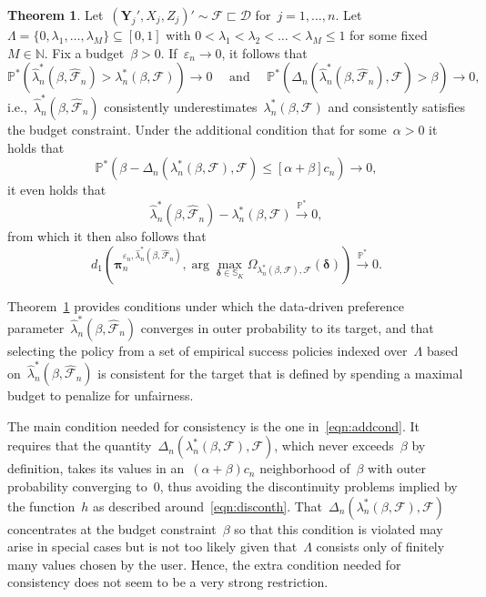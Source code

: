 \documentclass[11pt, a4paper]{article}
\newcommand{\N}{\mathbb{N}}
\newcommand{\cps}{\xrightarrow{\mathbb{P}^*}}
\theoremstyle{definition}
\newtheorem{theorem}{Theorem}[section]
\begin{document}
\begin{theorem}\label{thm:consitune}
Let~$(\bm{Y}_j', X_j, Z_j)' \sim \mathcal{F} \sqsubset \mathscr{D}$ for~$j =1, \hdots, n$. Let~$\Lambda = \{0, \lambda_1, \hdots, \lambda_M\} \subseteq [0, 1]$ with $0 < \lambda_1 < \lambda_2 < \hdots < \lambda_M \leq 1$ for some fixed~$M\in \N$. Fix a budget~$\beta > 0$. If~$\varepsilon_n \to 0$, it follows that
%
\begin{equation}\label{eqn:conscons}
\mathbb{P}^* \left(\hat{\lambda}_n^*(\beta, \hat{\mathcal{F}}_n) > \lambda_n^*(\beta, \mathcal{F}) \right) \to 0 \quad \text{ and } \quad \mathbb{P}^* \left(\Delta_n\left(\hat{\lambda}_n^*(\beta, \hat{\mathcal{F}}_n), \mathcal{F}\right) > \beta \right) \to 0,
\end{equation}
%
i.e.,~$\hat{\lambda}_n^*(\beta, \hat{\mathcal{F}}_n)$ consistently underestimates~$\lambda_n^*(\beta, \mathcal{F})$ and consistently satisfies the budget constraint. Under the additional condition that for some~$\alpha > 0$ it holds that 
\begin{equation}\label{eqn:addcond}
\mathbb{P}^*\left( \beta - \Delta_n\left(\lambda_n^*(\beta, \mathcal{F}), \mathcal{F}\right) \leq [\alpha + \beta]c_n \right) \to 0,
\end{equation}
it even holds that $$\hat{\lambda}_n^*(\beta, \hat{\mathcal{F}}_n) - \lambda_n^*(\beta, \mathcal{F}) \cps 0,$$ from which it then also follows that
\begin{equation}\label{eqn:consitune}
d_1\left( \bm{\pi}_n^{\varepsilon_n, \hat{\lambda}_n^*(\beta, \hat{\mathcal{F}}_n)}, \arg\max_{\bm{\delta} \in \mathbb{S}_K} \Omega_{ \lambda_n^{*}(\beta, \mathcal{F}), \mathcal{F}}(\bm{\delta}) \right) \cps 0.
\end{equation}
\end{theorem}

Theorem~\ref{thm:consitune} provides conditions under which the data-driven preference parameter~$\hat{\lambda}_n^*(\beta, \hat{\mathcal{F}}_n)$ converges in outer probability to its target, and that selecting the policy from a set of empirical success policies indexed over~$\Lambda$ based on~$\hat{\lambda}_n^*(\beta, \hat{\mathcal{F}}_n)$ is consistent for the target that is defined by spending a maximal budget to penalize for unfairness. 

The main condition needed for consistency is the one in~\eqref{eqn:addcond}. It requires that the quantity~$\Delta_n\left(\lambda_n^*(\beta, \mathcal{F}), \mathcal{F}\right)$, which never exceeds~$\beta$ by definition, takes its values in an~$(\alpha + \beta)c_n$ neighborhood of~$\beta$ with outer probability converging to~$0$, thus avoiding the discontinuity problems implied by the function~$h$ as described around~\eqref{eqn:disconth}. That~$\Delta_n\left(\lambda_n^*(\beta, \mathcal{F}), \mathcal{F}\right)$ concentrates at the budget constraint~$\beta$ so that this condition is violated may arise in special cases but is not too likely given that~$\Lambda$ consists only of finitely many values chosen by the user. Hence, the extra condition needed for consistency does not seem to be a very strong restriction. 
\end{document}
